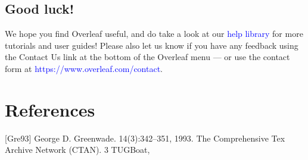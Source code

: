 \documentclass{article}
\begin{document}
\subsection{Good luck!}
We hope you find Overleaf useful, and do take a look at our {\textcolor{blue}{help library}} for more tutorials and user
guides! Please also let us know if you have any feedback using the Contact Us link at the bottom of
the Overleaf menu — or use the contact form at {\textcolor{blue}{https://www.overleaf.com/contact}}.

\section{References}
[Gre93] George D. Greenwade.
14(3):342–351, 1993.
The Comprehensive Tex Archive Network (CTAN).
3
TUGBoat,
\end{document}
